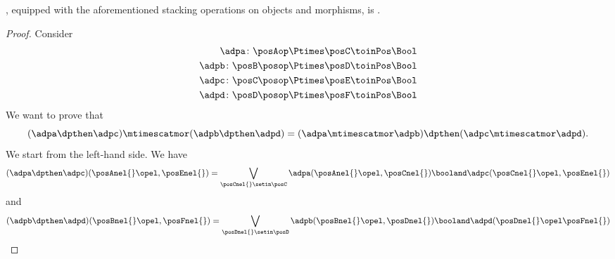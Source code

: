 \begin{lemma}\label{lem:DPL-functorial-stacking}
    \DPL, equipped with the aforementioned stacking operations on objects and morphisms, is .
\end{lemma}

\begin{proof}
    Consider
    \begin{equation}
        \begin{aligned}
            \adpa\colon \posAop\Ptimes \posC     & \toinPos \Bool \\
            \adpb\colon \posB\posop\Ptimes \posD & \toinPos \Bool \\
            \adpc\colon \posC\posop\Ptimes \posE & \toinPos \Bool \\
            \adpd\colon \posD\posop\Ptimes \posF & \toinPos \Bool
        \end{aligned}
    \end{equation}
    We want to prove that
    \begin{equation}
        (\adpa \dpthen \adpc)
        \mtimescatmor (\adpb \dpthen \adpd)=(\adpa \mtimescatmor \adpb) \dpthen (\adpc \mtimescatmor \adpd).
    \end{equation}
    We start from the left-hand side.
    We have
    \begin{equation}
        (\adpa \dpthen \adpc)(\posAnel{}\opel,\posEnel{})
        =\bigvee_{\posCnel{}\setin \posC}
        \adpa(\posAnel{}\opel, \posCnel{}) \booland \adpc(\posCnel{}\opel,\posEnel{})
    \end{equation}
    and
    \begin{equation}
        \begin{aligned}
            (\adpb \dpthen \adpd)(\posBnel{}\opel,\posFnel{})
            =\bigvee_{\posDnel{}\setin \posD}
            \adpb(\posBnel{}\opel, \posDnel{}) \booland \adpd(\posDnel{}\opel\posFnel{})

\end{aligned}
\end{equation}
\end{proof}
